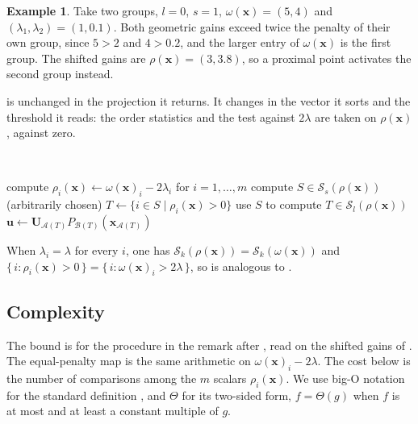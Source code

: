 \documentclass[11pt,a4paper]{article}
\theoremstyle{plain}
\theoremstyle{definition}
\newtheorem{example}{Example}
\theoremstyle{remark}
\newcommand*\R{\mathbb{R}}
\newcommand*\x{\mathbf{x}}
\newcommand*\U{\mathbf{u}}
\newcommand*\prox{\operatorname{prox}}
\begin{document}
\begin{example}
  \label{ex:unequal}
  Take two groups, \(l=0\), \(s=1\), \(\omega(\x)=(5,4)\) and \((\lambda_1,\lambda_2)=(1,0.1)\).
  Both geometric gains exceed twice the penalty of their own group, since \(5>2\) and \(4>0.2\), and the larger entry of \(\omega(\x)\) is the first group.
  The shifted gains are \(\rho(\x)=(3,3.8)\), so a proximal point activates the second group instead.
\end{example}

 is unchanged in the projection it returns.
It changes in the vector it sorts and the threshold it reads: the order statistics and the test against \(2\lambda\) are taken on \(\rho(\x)\), against zero.

\begin{algorithm}[ht]
  \caption{Group-sparse proximal mapping with group-dependent penalties}
  \label{alg:proxhlam}
  \Input{\(\x\in\R^n\),\ \(l\leq s\leq m\) and \(\lambda_i\geq 0\)}\\
  \Output{\(\U\in\prox_{h_{\lambda}}(\x)\)}
  \begin{algorithmic}[1]
    \State compute \(\rho_i(\x)\gets \omega(\x)_i-2\lambda_i\) for \(i=1,\ldots,m\)
    \State compute \(S\in \mathcal{S}_{s}(\rho(\x))\) (arbitrarily chosen)
    \If{\(\rho(\x)_{[l]} >0\)}
    \State \(T\gets\{i\in S\mid \rho_i(\x) >0\}\)
    \Else
    \State use \(S\) to compute \(T\in \mathcal{S}_l(\rho(\x))\)
    \EndIf
    \State \(\U\gets \mathbf{U}_{\mathcal{A}(T)} P_{\mathcal{B}(T)}\left(\x_{\mathcal{A}(T)}\right)\)
  \end{algorithmic}
\end{algorithm}

When \(\lambda_i=\lambda\) for every \(i\), one has \(\mathcal{S}_{k}(\rho(\x))=\mathcal{S}_{k}(\omega(\x))\) and \(\{\,i:\rho_i(\x)>0\,\}=\{\,i:\omega(\x)_i>2\lambda\,\}\), so  is analogous to .

\subsection{Complexity}
\label{sec:complexity}

The bound is for the procedure in the remark after , read on the shifted gains of .
The equal-penalty map is the same arithmetic on \(\omega(\x)_i-2\lambda\).
The cost below is the number of comparisons among the \(m\) scalars \(\rho_i(\x)\).
We use big-O notation for the standard definition \cite[\S1.2.11.1]{knuth1997}, and \(\Theta\) for its two-sided form, \(f=\Theta(g)\) when \(f\) is at most and at least a constant multiple of \(g\).
\end{document}
